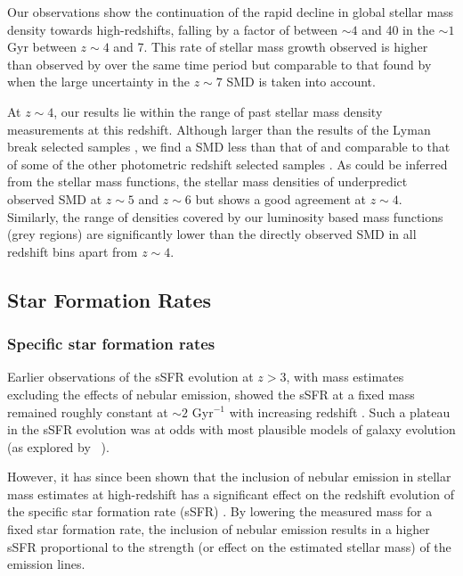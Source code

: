 Our observations show the continuation of the rapid decline in global stellar mass density towards high-redshifts, falling by a factor of between $\sim 4$ and 40 in the $\sim 1$ Gyr between $z \sim 4$ and 7. This rate of stellar mass growth observed is higher than observed by \citet{Gonzalez:2011dn} over the same time period but comparable to that found by \citet{Stark:2013ix} when the large uncertainty in the $z\sim7$ SMD is taken into account.

At $z \sim 4$, our results lie within the range of past stellar mass density measurements at this redshift. Although larger than the results of the Lyman break selected samples \citep{Gonzalez:2011dn,2012ApJ...752...66L,Stark:2013ix}, we find a SMD less than that of \citet{Santini:2012jq} and comparable to that of some of the other photometric redshift selected samples \citep{PerezGonzalez:2008cq,Marchesini:2009ef}. As could be inferred from the stellar mass functions, the stellar mass densities of \citet{Dave:2013bf} underpredict observed SMD at $z \sim 5$ and $z \sim 6$ but shows a good agreement at $z \sim 4$. Similarly, the range of densities covered by our luminosity based mass functions (grey regions) are significantly lower than the directly observed SMD in all redshift bins apart from $z\sim4$. 

\subsection{Star Formation Rates}
\subsubsection{Specific star formation rates}
Earlier observations of the sSFR evolution at $z > 3$, with mass estimates excluding the effects of nebular emission, showed the sSFR at a fixed mass remained roughly constant at $\sim 2$ Gyr$^{-1}$ with increasing redshift \citep{2009ApJ...697.1493S,Gonzalez:2010hm,2012ApJ...754...83B}. Such a plateau in the sSFR evolution was at odds with most plausible models of galaxy evolution (as explored by \citeauthor{Weinmann:2011hh}~\citeyear{Weinmann:2011hh}).

However, it has since been shown that the inclusion of nebular emission in stellar mass estimates at high-redshift has a significant effect on the redshift evolution of the specific star formation rate (sSFR) \citep{2009A&A...502..423S,2010A&A...515A..73S,Stark:2013ix,2014ApJ...781...34G}. By lowering the measured mass for a fixed star formation rate, the inclusion of nebular emission results in a higher sSFR proportional to the strength (or effect on the estimated stellar mass) of the emission lines.

